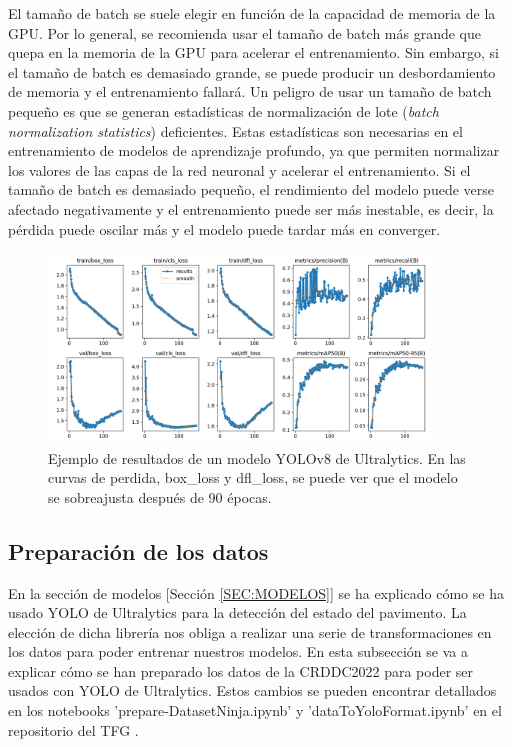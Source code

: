 El tamaño de batch se suele elegir en función de la capacidad de memoria de la GPU. Por lo general, se recomienda usar el tamaño de batch más grande que quepa en la memoria de la GPU para acelerar el entrenamiento. Sin embargo, si el tamaño de batch es demasiado grande, se puede producir un desbordamiento de memoria y el entrenamiento fallará. Un peligro de usar un tamaño de batch pequeño es que se generan estadísticas de normalización de lote (\textit{batch normalization statistics}) deficientes. Estas estadísticas son necesarias en el entrenamiento de modelos de aprendizaje profundo, ya que permiten normalizar los valores de las capas de la red neuronal y acelerar el entrenamiento. Si el tamaño de batch es demasiado pequeño, el rendimiento del modelo puede verse afectado negativamente y el entrenamiento puede ser más inestable, es decir, la pérdida puede oscilar más y el modelo puede tardar más en converger.

\begin{figure}[H]
    \centering
    \includegraphics[width=0.9\textwidth]{graphs/example_results.png}
    \caption{Ejemplo de resultados de un modelo YOLOv8 de Ultralytics. En las curvas de perdida, box\_loss y dfl\_loss, se puede ver que el modelo se sobreajusta después de 90 épocas.}
    \label{fig:example_results}
\end{figure}

\subsection{Preparación de los datos}
En la sección de modelos [Sección \ref{SEC:MODELOS}] se ha explicado cómo se ha usado YOLO de Ultralytics para la detección del estado del pavimento. La elección de dicha librería nos obliga a realizar una serie de transformaciones en los datos para poder entrenar nuestros modelos. En esta subsección se va a explicar cómo se han preparado los datos de la CRDDC2022 para poder ser usados con YOLO de Ultralytics. Estos cambios se pueden encontrar detallados en los notebooks 'prepare-DatasetNinja.ipynb' y 'dataToYoloFormat.ipynb' en el repositorio del TFG \cite{TFG_Repository}.

